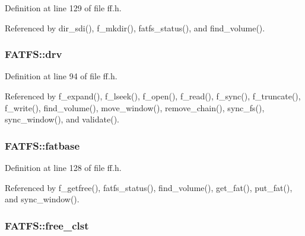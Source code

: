 Definition at line 129 of file ff.\+h.



Referenced by dir\+\_\+sdi(), f\+\_\+mkdir(), fatfs\+\_\+status(), and find\+\_\+volume().

\subsubsection[{\texorpdfstring{drv}{drv}}]{ F\+A\+T\+F\+S\+::drv}\hypertarget{structFATFS_a6a791560e2687e8b1569bfce61208d2d}{}\label{structFATFS_a6a791560e2687e8b1569bfce61208d2d}


Definition at line 94 of file ff.\+h.



Referenced by f\+\_\+expand(), f\+\_\+lseek(), f\+\_\+open(), f\+\_\+read(), f\+\_\+sync(), f\+\_\+truncate(), f\+\_\+write(), find\+\_\+volume(), move\+\_\+window(), remove\+\_\+chain(), sync\+\_\+fs(), sync\+\_\+window(), and validate().

\subsubsection[{\texorpdfstring{fatbase}{fatbase}}]{ F\+A\+T\+F\+S\+::fatbase}\hypertarget{structFATFS_a848fba02c4aabe02ef2984e578f33d64}{}\label{structFATFS_a848fba02c4aabe02ef2984e578f33d64}


Definition at line 128 of file ff.\+h.



Referenced by f\+\_\+getfree(), fatfs\+\_\+status(), find\+\_\+volume(), get\+\_\+fat(), put\+\_\+fat(), and sync\+\_\+window().

\subsubsection[{\texorpdfstring{free\+\_\+clst}{free_clst}}]{ F\+A\+T\+F\+S\+::free\+\_\+clst}\hypertarget{structFATFS_ac834248773bf338df807f0d7e6b6a579}{}\label{structFATFS_ac834248773bf338df807f0d7e6b6a579}



